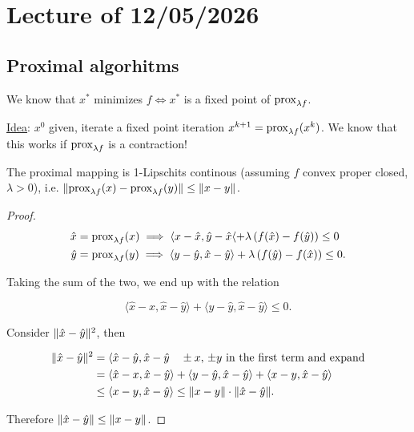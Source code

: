 \chapter{Lecture \thechapter{} of 12/05/2026}

\section{Proximal algorhitms}

We know that $x^*$ minimizes $f \iff x^*$ is a fixed point of $\mathrm{prox}_{\lambda f}$. 

\underline{Idea}: $x^0$ given, iterate a fixed point iteration $x^{k+1} = \mathrm{prox}_{\lambda f}(x^k)$. We know that this works if $\mathrm{prox}_{\lambda f}$ is a contraction!

\begin{proposition}
    
    The proximal mapping is 1-Lipschits continous (assuming $f$ convex proper closed, $\lambda > 0$), i.e. $\lVert \mathrm{prox}_{\lambda f}(x) - \mathrm{prox}_{\lambda f}(y) \rVert \le \lVert x - y \rVert$.

\end{proposition}

\begin{proof}
    
    \begin{align*}
        \hat{x} &= \mathrm{prox}_{\lambda f}(x) \implies \langle x - \hat{x}, \hat{y} - \hat{x} \langle + \lambda \left(f(\hat{x}) - f(\hat{y})\right) \le 0 \\
        \hat{y} &= \mathrm{prox}_{\lambda f}(y) \implies \langle y - \hat{y}, \hat{x} - \hat{y} \rangle + \lambda \left(f(\hat{y}) - f(\hat{x})\right) \le 0.
    \end{align*}

    Taking the sum of the two, we end up with the relation 

    \[ \langle \hat{x} - x, \hat{x} - \hat{y} \rangle + \langle y - \hat{y}, \hat{x} - \hat{y} \rangle \le 0. \]

    Consider $\lVert \hat{x} - \hat{y} \rVert^2$, then 

    \begin{align*}
        \lVert \hat{x} - \hat{y} \rVert^2 &= \langle \hat{x} - \hat{y}, \hat{x} - \hat{y} \quad \pm x, \, \pm y \text{ in the first term and expand} \\
        &= \langle \hat{x} - x, \hat{x}-\hat{y}\rangle + \langle y - \hat{y}, \hat{x} - \hat{y}\rangle + \langle x-y, \hat{x}-\hat{y}\rangle \\ 
        &\le \langle x-y, \hat{x} - \hat{y}\rangle \le \lVert x-y \rVert\cdot \lVert \hat{x} - \hat{y} \rVert.
    \end{align*}

    Therefore $\lVert \hat{x} - \hat{y} \rVert \le \lVert x-y \rVert$.

\end{proof}

